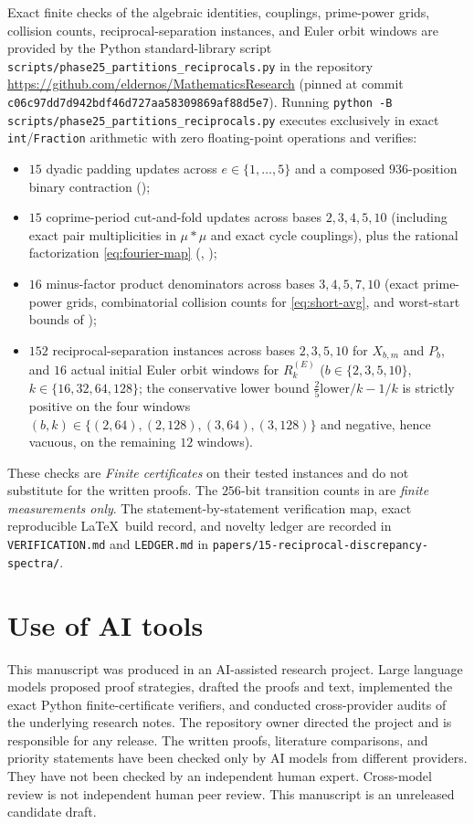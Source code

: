 \documentclass[11pt]{article}
\newcommand{\ttt}[1]{\texttt{#1}}
\begin{document}
Exact finite checks of the algebraic identities, couplings, prime-power grids, collision counts, reciprocal-separation instances, and Euler orbit windows are provided by the Python standard-library script \nolinkurl{scripts/phase25_partitions_reciprocals.py} in the repository \url{https://github.com/eldernos/MathematicsResearch} (pinned at commit \nolinkurl{c06c97dd7d942bdf46d727aa58309869af88d5e7}). Running \ttt{python -B} \nolinkurl{scripts/phase25_partitions_reciprocals.py} executes exclusively in exact \ttt{int}/\ttt{Fraction} arithmetic with zero floating-point operations and verifies:
\begin{itemize}[nosep]
\item $15$ dyadic padding updates across $e\in\{1,\dots,5\}$ and a composed $936$-position binary contraction ();
\item $15$ coprime-period cut-and-fold updates across bases $2,3,4,5,10$ (including exact pair multiplicities in $\mu*\mu$ and exact cycle couplings), plus the rational factorization \eqref{eq:fourier-map} (, );
\item $16$ minus-factor product denominators across bases $3,4,5,7,10$ (exact prime-power grids, combinatorial collision counts for \eqref{eq:short-avg}, and worst-start bounds of );
\item $152$ reciprocal-separation instances across bases $2,3,5,10$ for $X_{b,m}$ and $P_b$, and $16$ actual initial Euler orbit windows for $R_k^{(E)}$ ($b\in\{2,3,5,10\}$, $k\in\{16,32,64,128\}$; the conservative lower bound $\frac25\text{lower}/k-1/k$ is strictly positive on the four windows $(b,k)\in\{(2,64),(2,128),(3,64),(3,128)\}$ and negative, hence vacuous, on the remaining $12$ windows).
\end{itemize}
These checks are \emph{Finite certificates} on their tested instances and do not substitute for the written proofs. The $256$-bit transition counts in  are \emph{finite measurements only}. The statement-by-statement verification map, exact reproducible \LaTeX\ build record, and novelty ledger are recorded in \ttt{VERIFICATION.md} and \ttt{LEDGER.md} in \nolinkurl{papers/15-reciprocal-discrepancy-spectra/}.

\section{Use of AI tools}\label{sec:ai}

This manuscript was produced in an AI-assisted research project. Large language models proposed proof strategies, drafted the proofs and text, implemented the exact Python finite-certificate verifiers, and conducted cross-provider audits of the underlying research notes. The repository owner directed the project and is responsible for any release. The written proofs, literature comparisons, and priority statements have been checked only by AI models from different providers. They have not been checked by an independent human expert. Cross-model review is not independent human peer review. This manuscript is an unreleased candidate draft.



\end{document}
